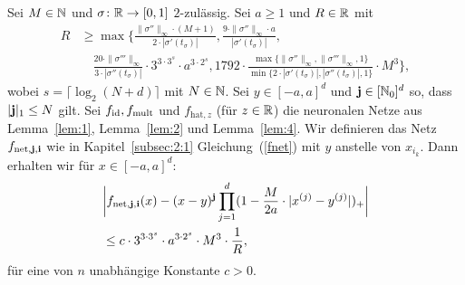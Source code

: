 \begin{lem}
\label{lem:5}
Sei $M \in \mathbb{N}$ und $\sigma\colon \mathbb{R} \to [0, 1]$ $2$-zulässig.
Sei $a \geq 1$ und $R \in \mathbb{R}$ mit
\begin{equation*}
\begin{split}
R & \geq \max\biggl\{\frac{\|\sigma''\|_{\infty} \cdot (M + 1)}{2 \cdot |\sigma'(t_{\sigma})|}, \frac{9 \cdot \|\sigma''\|_{\infty} \cdot a}{|\sigma'(t_{\sigma})|}, \\
& \quad \frac{20 \cdot \|\sigma'''\|_{\infty}}{3 \cdot |\sigma''(t_{\sigma})|} \cdot 3^{3 \cdot 3^s} \cdot a^{3 \cdot 2^s}, 1792 \cdot \frac{\max\{\|\sigma''\|_{\infty},\|\sigma'''\|_{\infty}, 1\}}{\min\{2 \cdot |\sigma'(t_{\sigma})|, |\sigma''(t_{\sigma})|, 1\}} \cdot M^3 \biggr\},
\end{split}
\end{equation*}
wobei $s = \lceil\log_2(N + d)\rceil$ mit $N \in \mathbb{N}$. Sei $y \in [-a, a]^d$ und $\mathbf{j} \in [\mathbb{N}_0]^d$ so, dass $|\mathbf{j}|_1 \leq N$ gilt. Sei $f_{\mathrm{id}}, f_{\mathrm{mult}}$ und $f_{\mathrm{hat}, z}$ (für $z \in \mathbb{R}$) die neuronalen Netze aus Lemma~\ref{lem:1}, Lemma~\ref{lem:2} und Lemma~\ref{lem:4}. Wir definieren das Netz $f_{\mathrm{net},\mathbf{j},\mathbf{i}}$ wie in Kapitel~\ref{subsec:2:1} Gleichung~(\ref{fnet}) mit $y$ anstelle von $x_{{i}_k}$.
Dann erhalten wir für $x \in [-a, a]^d$:
\begin{equation*}
\begin{split}
& \bigg|f_{\mathrm{net},\mathbf{j},\mathbf{i}}(x) - (x - y)^{\mathbf{j}} \prod_{j = 1}^d (1 - \frac{M}{2a} \cdot |x^{(j)} - y^{(j)}|)_+\bigg| \\
& \leq c \cdot 3^{3 \cdot 3^s} \cdot a^{3 \cdot 2^s} \cdot M^3 \cdot \frac{1}{R},
\end{split}
\end{equation*}
für eine von $n$ unabhängige Konstante $c > 0$.
\end{lem}

